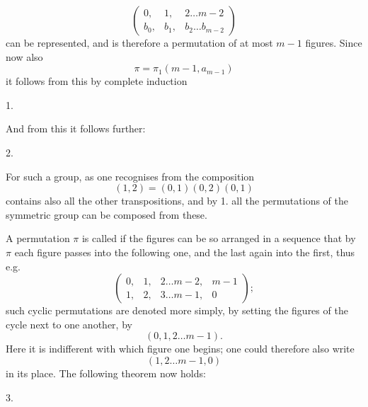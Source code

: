 \[
\begin{pmatrix} 0, & 1, & 2 \dots m-2 \\ b_0, & b_1, & b_2 \dots b_{m-2} \end{pmatrix}
\]
can be represented, and is therefore a permutation of at most $m-1$ figures. Since now also
\[
\pi = \pi_1(m-1, a_{m-1})
\]
it follows from this by complete induction

1. 

And from this it follows further:

2. 

For such a group, as one recognises from the composition
\[
(1,2) = (0,1)(0,2)(0,1)
\]
contains also all the other transpositions, and by 1. all the permutations of the symmetric group can be composed from these.

A permutation $\pi$ is called  if the figures can be so arranged in a sequence that by $\pi$ each figure passes into the following one, and the last again into the first, thus e.g.
\[
\begin{pmatrix} 0, & 1, & 2 \dots m-2, & m-1 \\ 1, & 2, & 3 \dots m-1, & 0 \end{pmatrix};
\]
such cyclic permutations are denoted more simply, by setting the figures of the cycle next to one another, by
\[
(0, 1, 2 \dots m-1).
\]
Here it is indifferent with which figure one begins; one could therefore also write
\[
(1, 2 \dots m-1, 0)
\]
in its place. The following theorem now holds:

3. 

